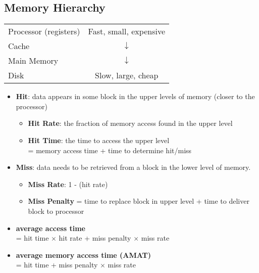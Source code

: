 \documentclass{../cheatsheet}
\begin{document}
\begin{multicols*}{2}
    \section{Memory Hierarchy}
    \begin{tabular}{l c}
        Processor (registers) & Fast, small, expensive \\
        Cache & $\downarrow$ \\
        Main Memory & $\downarrow$ \\
        Disk & Slow, large, cheap
    \end{tabular}

    \begin{itemize}
        \item \textbf{Hit}: data appears in some block in the upper levels of
            memory (closer to the processor)
            \begin{itemize}
                \item \textbf{Hit Rate}: the fraction of memory access found in
                    the upper level
                \item \textbf{Hit Time}: the time to access the upper level \\
                    = memory access time + time to determine hit/miss
            \end{itemize}

        \item \textbf{Miss}: data needs to be retrieved from a block in the
            lower level of memory.
            \begin{itemize}
                \item \textbf{Miss Rate}: 1 - (hit rate)
                \item \textbf{Miss Penalty} = time to replace block in upper
                    level + time to deliver block to processor
            \end{itemize}

        \item \textbf{average access time}\\
            = hit time $\times$ hit rate + miss penalty $\times$ miss rate

        \item \textbf{average memory access time (AMAT)}\\
            = hit time + miss penalty $\times$ miss rate
    \end{itemize}


\end{multicols*}
\end{document}
